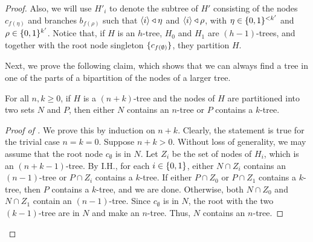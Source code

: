 \begin{theorem}
\begin{proof}
                Also, we will use $H'_i$ to denote the subtree of $H'$ consisting of the nodes $c_{f(\eta)}$ and branches
                $b_{f(\rho)}$ such that $\left< i \right> \triangleleft \eta$ and $\left< i \right> \triangleleft \rho$, with $\eta \in \{ 0,1 \}^{<k'}$
                and $\rho \in \{ 0,1 \}^{k'}$.
                Notice that, if $H$ is an $h$-tree, $H_0$ and $H_1$ are $(h-1)$-trees, and together with the root node
                singleton $\{ c_{f(\emptyset)} \}$, they partition $H$.

                Next, we prove the following claim, which shows that we can always find a tree
                in one of the parts of a bipartition of the nodes of a larger tree.

                \begin{claim} \label{clm:n_or_k_tree_in_partition_of_n_plus_k_tree}
                    For all $n, k \geq 0$, if $H$ is a $(n + k)$-tree and the nodes of $H$ are partitioned into two sets $N$ and $P$,
                    then either $N$ contains an $n$-tree or $P$ contains a $k$-tree.
                    \begin{proof}[Proof of ]
                        We prove this by induction on $n + k$.
                        Clearly, the statement is true for the trivial case $n = k = 0$.
                        Suppose $n + k > 0$.
                        Without loss of generality, we may assume that the root node $c_\emptyset$ is in $N$.
                        Let $Z_i$ be the set of nodes of $H_i$, which is an $(n+k-1)$-tree.
                        By I.H., for each $i \in \{ 0,1 \}$, either $N \cap Z_i$ contains an $(n-1)$-tree or
                        $P \cap Z_i$ contains a $k$-tree.
                        If either $P \cap Z_0$ or $P \cap Z_1$ contains a $k$-tree, then $P$ contains a $k$-tree, and we are done.
                        Otherwise, both $N \cap Z_0$ and $N \cap Z_1$ contain an $(n-1)$-tree.
                        Since $c_\emptyset$ is in $N$, the root with the two $(k-1)$-tree are in $N$ and make an $n$-tree.
                        Thus, $N$ contains an $n$-tree.
                    \end{proof}
                \end{claim}

                


\end{proof}
\end{theorem}
